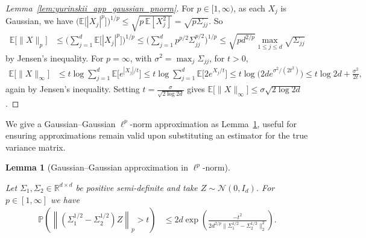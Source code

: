\documentclass[11pt,lof]{puthesis}
\renewcommand{\P}{\ensuremath{\mathbb{P}}}
\newcommand{\R}{\ensuremath{\mathbb{R}}}
\newcommand{\E}{\ensuremath{\mathbb{E}}}
\newcommand{\cN}{\ensuremath{\mathcal{N}}}
\theoremstyle{break}
\newtheorem{lemma}{Lemma}[section]
\theoremstyle{proof}
\newtheorem{proof}{Proof}
\begin{document}
\begin{proof}[Lemma~\ref{lem:yurinskii_app_gaussian_pnorm}]

  For $p \in [1, \infty)$,
  as each $X_j$ is Gaussian, we have
  $\big(\E\big[|X_j|^p\big]\big)^{1/p}
  \leq \sqrt{p\, \E[X_j^2]}
  = \sqrt{p \Sigma_{j j}}$.
  So
  \begin{align*}
    \E\big[\|X\|_p\big]
    &\leq
    \Bigg(\sum_{j=1}^d \E \big[ |X_j|^p \big] \Bigg)^{1/p}
    \leq \Bigg(\sum_{j=1}^d p^{p/2} \Sigma_{j j}^{p/2} \Bigg)^{1/p}
    \leq \sqrt{p d^{2/p}}
    \max_{1\leq j\leq d}
    \sqrt{\Sigma_{j j}}
  \end{align*}
  by Jensen's inequality.
  For $p=\infty$,
  with $\sigma^2 = \max_j \Sigma_{j j}$,
  for $t>0$,
  \begin{align*}
    \E\big[\|X\|_\infty \big]
    &\leq
    t
    \log
    \sum_{j=1}^d
    \E\Big[
      e^{|X_j| / t}
    \Big]
    \leq
    t
    \log
    \sum_{j=1}^d
    \E\Big[
      2 e^{X_j / t}
    \Big]
    \leq t \log \Big(2 d e^{\sigma^2/(2t^2)}\Big)
    \leq t \log 2 d + \frac{\sigma^2}{2t},
  \end{align*}
  again by Jensen's inequality.
  Setting $t = \frac{\sigma}{\sqrt{2 \log 2d}}$ gives
  $\E\big[\|X\|_\infty \big] \leq \sigma \sqrt{2 \log 2d}$.
\end{proof}

We give a Gaussian--Gaussian $\ell^p$-norm approximation
as Lemma~\ref{lem:yurinskii_app_feasible_gaussian}, useful for
ensuring approximations remain valid upon substituting
an estimator for the true variance matrix.

\begin{lemma}[Gaussian--Gaussian approximation in
  \texorpdfstring{$\ell^p$}{lp}-norm]%
  \label{lem:yurinskii_app_feasible_gaussian}

  Let $\Sigma_1, \Sigma_2 \in \R^{d \times d}$ be positive semi-definite
  and take $Z \sim \cN(0, I_d)$.
  For $p \in [1, \infty]$ we have
  \begin{align*}
    \P\left(
      \left\|
        \left(\Sigma_1^{1/2} - \Sigma_2^{1/2}\right) Z
      \right\|_p
      > t
    \right)
    &\leq
    2 d \exp \left(
      \frac{-t^2}
      {2 d^{2/p} \big\|\Sigma_1^{1/2} - \Sigma_2^{1/2}\big\|_2^2}
    \right).
  \end{align*}

\end{lemma}
\end{document}
